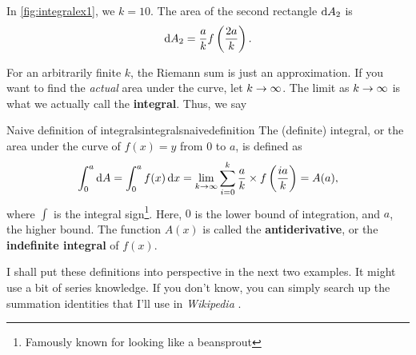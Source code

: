 In \cref{fig:integralex1}, we  \(k = 10\). The area of the second rectangle \(\odif{A_2}\) is
\begin{equation*}
  \odif{A_2} = \frac{a}{k}f\left(\frac{2a}{k}\right).
\end{equation*}

For an arbitrarily finite \(k\), the Riemann sum is just an approximation. If you want to find the \textit{actual} area under the curve, let \(k \rightarrow \infty\). The limit as \(k \rightarrow \infty\) is what we actually call the \textbf{integral}. Thus, we say
\begin{df}{Naive definition of integrals}{integralsnaivedefinition}
  The (definite) integral, or the area under the curve of \(f(x) = y\) from \(0\) to \(a\), is defined as
  \begin{equation}
    \int_{0}^{a}\odif{A} = \int_{0}^{a}f(x)\odif{x} = \lim_{k \appr \infty}\sum_{i = 0}^{k}\frac{a}{k} \times f\left(\frac{ia}{k}\right) = A(a),
  \end{equation}
  where \(\int\) is the integral sign\footnote{Famously known for looking like a beansprout}. Here, \(0\) is the lower bound of integration, and \(a\), the higher bound. The function \(A(x)\) is called the \textbf{antiderivative}, or the \textbf{indefinite integral} of \(f(x)\).
\end{df}

I shall put these definitions into perspective in the next two examples. It might use a bit of series knowledge. If you don't know, you can simply search up the summation identities that I'll use in \emph{Wikipedia} \cite{wikipedia-summation}.

